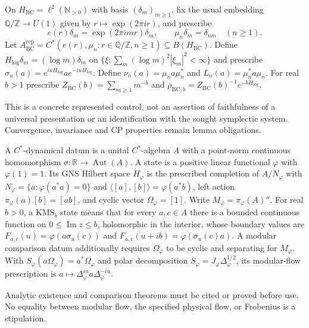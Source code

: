 \begin{definition}
On $H_{\mathrm{BC}}=\ell^2(\mathbb N_{>0})$ with basis $(\delta_m)_{m\geq1}$,
fix the usual embedding $\mathbb Q/\mathbb Z\to U(1)$ given by
$r\mapsto\exp(2\pi i r)$, and prescribe
\[
 e(r)\delta_m=\exp(2\pi i mr)\delta_m,\qquad
 \mu_n\delta_m=\delta_{nm}\quad(n\geq1).
\]
Let $A_{\mathrm{BC}}^{\mathrm{rep}}=C^*(e(r),\mu_n:r\in\mathbb Q/\mathbb Z,
n\geq1)\subseteq B(H_{\mathrm{BC}})$.
Define $H_{\log}\delta_m=(\log m)\delta_m$ on
$\{\xi:\sum_m(\log m)^2|\xi_m|^2<\infty\}$ and prescribe
$\sigma_u(a)=e^{iuH_{\log}}ae^{-iuH_{\log}}$.
Define $\nu_n(a)=\mu_na\mu_n^*$ and $L_n(a)=\mu_n^*a\mu_n$.
For real $b>1$ prescribe
$Z_{\mathrm{BC}}(b)=\sum_{m\geq1}m^{-b}$ and
$\rho_{\mathrm{BC},b}=Z_{\mathrm{BC}}(b)^{-1}e^{-bH_{\log}}$.
\end{definition}
\begin{scope}
This is a concrete represented control, not an assertion of faithfulness of a universal presentation or an identification with the sought symplectic system. Convergence, invariance and CP properties remain lemma obligations.
\end{scope}

\begin{definition}
A $C^*$-dynamical datum is a unital $C^*$-algebra $A$ with a point-norm
continuous homomorphism $\sigma:\mathbb R\to\operatorname{Aut}(A)$.
A state is a positive linear functional $\varphi$ with $\varphi(1)=1$.
Its GNS Hilbert space $H_\varphi$ is the prescribed completion of
$A/N_\varphi$ with
$N_\varphi=\{a:\varphi(a^*a)=0\}$ and
$\langle[a],[b]\rangle=\varphi(a^*b)$, left action
$\pi_\varphi(a)[b]=[ab]$, and cyclic vector $\Omega_\varphi=[1]$.
Write $M_\varphi=\pi_\varphi(A)''$.
For real $b>0$, a $\mathrm{KMS}_b$ state means that for every $a,c\in A$
there is a bounded continuous function on $0\leq\operatorname{Im}z\leq b$,
holomorphic in the interior, whose boundary values are
$F_{a,c}(u)=\varphi(a\sigma_u(c))$ and
$F_{a,c}(u+ib)=\varphi(\sigma_u(c)a)$.
A modular comparison datum additionally requires $\Omega_\varphi$ to be
cyclic and separating for $M_\varphi$. With
$S_\varphi(a\Omega_\varphi)=a^*\Omega_\varphi$ and polar decomposition
$\overline S_\varphi=J_\varphi\Delta_\varphi^{1/2}$, its modular-flow
prescription is $a\mapsto\Delta_\varphi^{iu}a\Delta_\varphi^{-iu}$.
\end{definition}
\begin{scope}
Analytic existence and comparison theorems must be cited or proved before use. No equality between modular flow, the specified physical flow, or Frobenius is a stipulation.
\end{scope}

